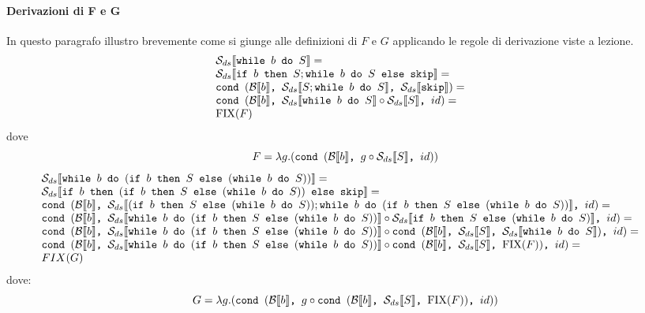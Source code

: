 {\paragraph{Derivazioni di F e G}
In questo paragrafo illustro brevemente come si giunge alle definizioni di $F$ e $G$ applicando 
le regole di derivazione viste a lezione.
$$
\begin{array}{ll}
\dsCtxt{\wbS{b}{S}} = & \\
\dsCtxt{\ifABC{b}{S; \wbS{b}{S}}{\skipForFriends}} = & \\
\cond{b}{\dsCtxt{S; \wbS{b}{S}}}{\dsCtxt{\skipForFriends}} = & \\
\cond{b}{\dsCtxt{\wbS{b}{S}} \circ \dsCtxt{S}}{id} = & \\
\fixp{F}
\end{array}
$$
dove 
$$
F = \lambda g. (\cond{b}{g \circ \dsCtxt{S}}{id})
$$
$$
\begin{array}{ll}
\dsCtxt{\wbS{b}{(\ifABC{b}{S}{(\wbS{b}{S})})}} = & \\
\dsCtxt{\ifABC{b}{(\ifABC{b}{S}{(\wbS{b}{S})})}{\skipForFriends}} = & \\
\cond
{b}
{\dsCtxt{(\ifABC{b}{S}{(\wbS{b}{S})}); \wbS{b}{(\ifABC{b}{S}{(\wbS{b}{S})})}}}
{id}
= & \\
\cond{b}
{\dsCtxt{\wbS{b}{(\ifABC{b}{S}{(\wbS{b}{S})})}} \circ
	\dsCtxt{\ifABC{b}{S}{(\wbS{b}{S})}}}{id} = & \\
\cond{b}
{
	\dsCtxt{\wbS{b}{(\ifABC{b}{S}{(\wbS{b}{S})})}} \circ
	\cond{b}{\dsCtxt{S}}{\dsCtxt{\wbS{b}{S}}}
}{id} =  & \\
\cond{b}
{
	\dsCtxt{\wbS{b}{(\ifABC{b}{S}{(\wbS{b}{S})})}} \circ
	\cond{b}{\dsCtxt{S}}{\fixp{F}}
}{id} = & \\
FIX(G)
\end{array}
$$
dove:
$$
G = \lambda g .(\cond{b}{g \circ \cond{b}{\dsCtxt{S}}{\fixp{F}}}{id})
$$
}